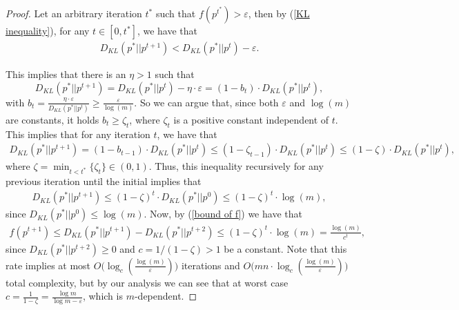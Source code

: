 \documentclass[11pt, letterpaper]{article}
\begin{document}
\begin{proof}
Let an arbitrary iteration $t^*$ such that $f(p^{t^*})> \varepsilon$, then by (\ref{KL inequality}), for any $t \in [0,t^*]$, we have that
 \begin{equation}
\begin{split}
D_{KL}(p^*||p^{t+1}) < D_{KL}(p^*||p^{t}) -\varepsilon.
\end{split}
 \end{equation}

\noindent This implies that there is an $\eta>1$ such that
\[
    D_{KL}(p^* || p^{t+1}) =   D_{KL}(p^* || p^{t}) - \eta \cdot \varepsilon = (1 - b_{t}) \cdot D_{KL}(p^* || p^{t}),
\] 
with $b_{t} =  \frac{\eta \cdot \varepsilon} {D_{KL}(p^* || p^{t})}\geq \frac{\varepsilon} {\log (m) }$. 
So we can argue that, since both $\varepsilon$ and $\log (m)$ are constants, it holds $b_{t} \geq \zeta_{t}$, where $\zeta_{t}$ is a positive constant independent of $t$. This implies that for any iteration $t$, we have that
\begin{equation*}
\begin{split}
    D_{KL}(p^* || p^{t+1}) = (1-b_{t-1})\cdot D_{KL}(p^* || p^{t}) \leq (1-\zeta_{t-1}) \cdot D_{KL}(p^* || p^{t})\leq (1-\zeta) \cdot D_{KL}(p^* || p^{t}),
\end{split}
\end{equation*}
where $\zeta = \min_{t < t^*} \{\zeta_t\} \in (0,  1)$. Thus, this inequality recursively for any previous iteration until the initial implies that 
\begin{equation*}
\begin{split}
    D_{KL}(p^* || p^{t+1}) \leq (1-\zeta)^t \cdot D_{KL}(p^* || p^{0}) \leq (1-\zeta)^t \cdot \log (m),  
\end{split}
\end{equation*}
since $D_{KL}(p^*||p^{0}) \leq \log (m)$.
Now, by (\ref{bound of f}) we have that 
\begin{equation*}
\begin{split}
    f(p^{t+1}) \leq D_{KL}(p^* || p^{t+1}) -D_{KL}(p^* || p^{t+2}) \leq (1-\zeta)^t \cdot \log (m)=\frac{\log(m)}{c^t},  
\end{split}
\end{equation*}
since $D_{KL}(p^* || p^{t+2}) \geq 0$ and
$c = 1/(1-\zeta) > 1$ be a constant. Note that this rate implies at most $O\Big(\log_c \left(\frac{\log(m)}{\varepsilon}\right) \Big)$ iterations and $O\Big(m n \cdot \log_c \left(\frac{\log(m)}{\varepsilon}\right) \Big)$ total complexity, but by our analysis we can see that at worst case $c = \frac{1}{1-\zeta}  = \frac{\log m}{\log m - \varepsilon}$, which is $m$-dependent.
\end{proof}
\end{document}
